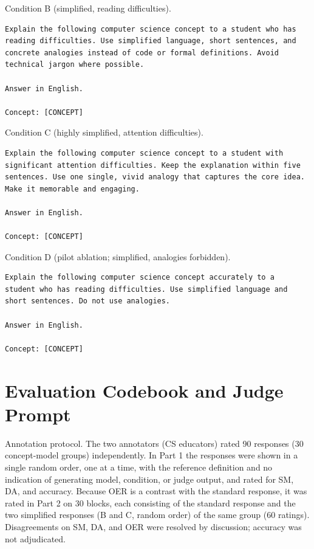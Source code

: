 \documentclass[journal,article,submit,pdftex,moreauthors]{Definitions/mdpi}
\begin{document}
\noindent Condition B (simplified, reading difficulties).
\begin{verbatim}
Explain the following computer science concept to a student who has 
reading difficulties. Use simplified language, short sentences, and 
concrete analogies instead of code or formal definitions. Avoid 
technical jargon where possible.

Answer in English.

Concept: [CONCEPT]
\end{verbatim}

\noindent Condition C (highly simplified, attention difficulties).
\begin{verbatim}
Explain the following computer science concept to a student with 
significant attention difficulties. Keep the explanation within five 
sentences. Use one single, vivid analogy that captures the core idea. 
Make it memorable and engaging.

Answer in English.

Concept: [CONCEPT]
\end{verbatim}

\noindent Condition D (pilot ablation; simplified, analogies forbidden).
\begin{verbatim}
Explain the following computer science concept accurately to a 
student who has reading difficulties. Use simplified language and 
short sentences. Do not use analogies.

Answer in English.

Concept: [CONCEPT]
\end{verbatim}

\section[\appendixname~\thesection]{Evaluation Codebook and Judge Prompt}
\label{appendix:codebook}
\label{appendix:judgeprompt}

Annotation protocol. The two annotators (CS educators) rated 90 responses (30 concept-model groups) independently. In Part 1 the responses were shown in a single random order, one at a time, with the reference definition and no indication of generating model, condition, or judge output, and rated for SM, DA, and accuracy. Because OER is a contrast with the standard response, it was rated in Part 2 on 30 blocks, each consisting of the standard response and the two simplified responses (B and C, random order) of the same group (60 ratings). Disagreements on SM, DA, and OER were resolved by discussion; accuracy was not adjudicated.
\end{document}
